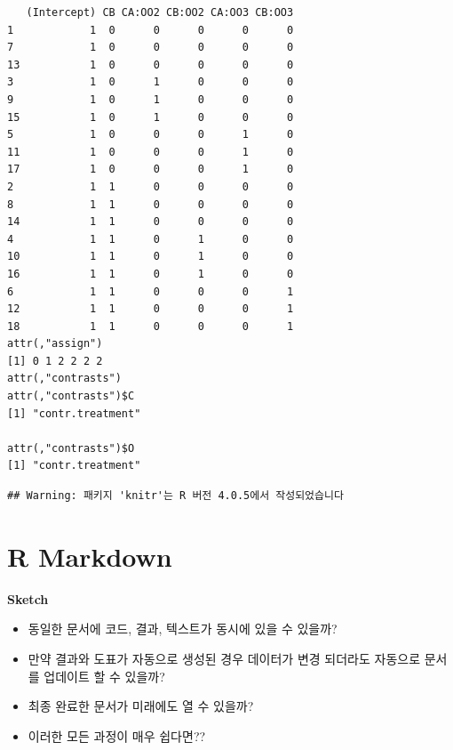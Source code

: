 \documentclass[
  11pt,
]{krantz}
\makeatletter
\providecommand{\tightlist}{%
  \setlength{\itemsep}{0pt}\setlength{\parskip}{0pt}}
\newenvironment{kframe}{%
\medskip{}
\setlength{\fboxsep}{.8em}
 \def\at@end@of@kframe{}%
 \ifinner\ifhmode%
  \def\at@end@of@kframe{\end{minipage}}%
  \begin{minipage}{\columnwidth}%
 \fi\fi%
 \def\FrameCommand##1{\hskip\@totalleftmargin \hskip-\fboxsep
 \colorbox{shadecolor}{##1}\hskip-\fboxsep
     \hskip-\linewidth \hskip-\@totalleftmargin \hskip\columnwidth}%
 \MakeFramed {\advance\hsize-\width
   \@totalleftmargin\z@ \linewidth\hsize
   \@setminipage}}%
 {\par\unskip\endMakeFramed%
 \at@end@of@kframe}
\renewenvironment{quote}{\begin{kframe}}{\end{kframe}}
\makeatother
\begin{document}
\begin{verbatim}
   (Intercept) CB CA:OO2 CB:OO2 CA:OO3 CB:OO3
1            1  0      0      0      0      0
7            1  0      0      0      0      0
13           1  0      0      0      0      0
3            1  0      1      0      0      0
9            1  0      1      0      0      0
15           1  0      1      0      0      0
5            1  0      0      0      1      0
11           1  0      0      0      1      0
17           1  0      0      0      1      0
2            1  1      0      0      0      0
8            1  1      0      0      0      0
14           1  1      0      0      0      0
4            1  1      0      1      0      0
10           1  1      0      1      0      0
16           1  1      0      1      0      0
6            1  1      0      0      0      1
12           1  1      0      0      0      1
18           1  1      0      0      0      1
attr(,"assign")
[1] 0 1 2 2 2 2
attr(,"contrasts")
attr(,"contrasts")$C
[1] "contr.treatment"

attr(,"contrasts")$O
[1] "contr.treatment"
\end{verbatim}

\normalsize

\begin{verbatim}
## Warning: 패키지 'knitr'는 R 버전 4.0.5에서 작성되었습니다
\end{verbatim}

\hypertarget{r-markdown}{%
\chapter{R Markdown}\label{r-markdown}}

\begin{quote}
\textbf{Sketch}

\begin{itemize}
\tightlist
\item
  동일한 문서에 코드, 결과, 텍스트가 동시에 있을 수 있을까?
\item
  만약 결과와 도표가 자동으로 생성된 경우 데이터가 변경 되더라도 자동으로 문서를 업데이트 할 수 있을까?
\item
  최종 완료한 문서가 미래에도 열 수 있을까?
\item
  이러한 모든 과정이 매우 쉽다면??
\end{itemize}
\end{quote}

\footnotesize
\end{document}
